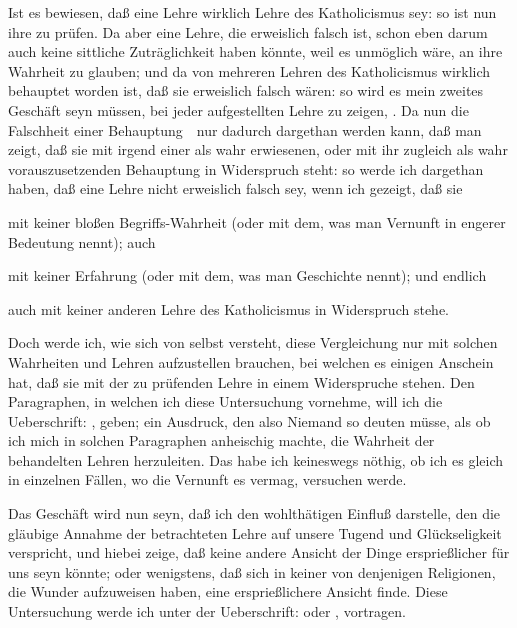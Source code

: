 \begin{aufza}
\begin{aufzb}
\item Ist es bewiesen, daß eine Lehre wirklich Lehre des Katholicismus sey: so ist nun ihre  zu prüfen. Da aber eine Lehre, die erweislich falsch ist, schon eben darum auch keine sittliche Zuträglichkeit haben könnte, weil es unmöglich wäre, an ihre Wahrheit zu glauben; und da von mehreren Lehren des Katholicismus wirklich behauptet worden ist, daß sie erweislich falsch wären: so wird es mein zweites Geschäft seyn müssen, bei jeder aufgestellten Lehre zu zeigen, . Da nun die Falschheit einer Behauptung~\ nur dadurch dargethan werden kann, daß man zeigt, daß sie mit irgend einer als wahr erwiesenen, oder mit ihr zugleich als wahr vorauszusetzenden Behauptung in Widerspruch steht: so werde ich dargethan haben, daß eine Lehre nicht erweislich falsch sey, wenn ich gezeigt, daß sie
\begin{aufzc}
\item mit keiner bloßen Begriffs-Wahrheit (oder mit dem, was man Vernunft in engerer Bedeutung nennt); auch
\item mit keiner Erfahrung (oder mit dem, was man Geschichte nennt); und endlich
\item auch mit keiner anderen Lehre des Katholicismus in Widerspruch stehe.
\end{aufzc}
Doch werde ich, wie sich von selbst versteht, diese Vergleichung nur mit solchen Wahrheiten und Lehren aufzustellen brauchen, bei welchen es einigen Anschein hat, daß sie mit der zu prüfenden Lehre in einem Widerspruche stehen. Den Paragraphen, in welchen ich diese Untersuchung vornehme, will ich die Ueberschrift: , geben; ein Ausdruck, den also Niemand so deuten müsse, als ob ich mich in solchen Paragraphen anheischig machte, die Wahrheit der behandelten Lehren  herzuleiten. Das habe ich keineswegs nöthig, ob ich es gleich in einzelnen Fällen, wo die Vernunft es vermag, versuchen werde.
\item Das  Geschäft wird nun seyn, daß ich den wohl\-thä\-ti\-gen Einfluß darstelle, den die gläubige Annahme der betrachteten Lehre auf unsere Tugend und Glückseligkeit verspricht, und hiebei zeige, daß keine andere Ansicht der Dinge ersprießlicher für uns seyn könnte; oder wenigstens, daß sich in keiner von denjenigen Religionen, die Wunder aufzuweisen haben, eine ersprießlichere Ansicht finde. Diese Untersuchung werde ich unter der Ueberschrift:  oder , vortragen.

\end{aufzb}
\end{aufza}
